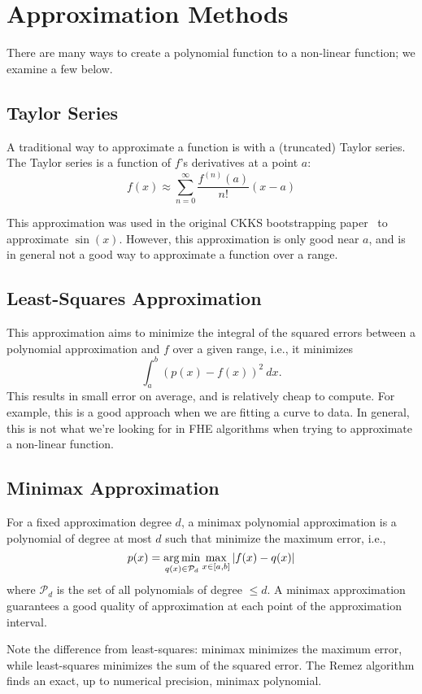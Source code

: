 \documentclass[../fheimpl.tex]{subfiles}
\begin{document}
    \section{Approximation Methods}
    \label{sec:polyapprox}
    There are many ways to create a polynomial function to a non-linear function; we examine a few below.
    
    
    \subsection{Taylor Series}
    A traditional way to approximate a function is with a (truncated) Taylor series. The Taylor series is a function of $f$'s derivatives at a point $a$: 
    \[f(x)\approx \sum_{n=0}^\infty\frac{f^{(n)}(a)}{n!}(x-a)\]
    
    This approximation was used in the original CKKS bootstrapping paper~\cite{cryptoeprint:2018/153} to approximate $\sin(x)$.
    However, this approximation is only good near $a$, and is in general not a good way to approximate a function over a range.
    
    
    \subsection{Least-Squares Approximation}
    This approximation aims to minimize the integral of the squared errors between a polynomial approximation and $f$ over a given range, i.e., it minimizes
    \[\int_a^b (p(x)-f(x))^2\ dx.\] 
    This results in small error on average, and is relatively cheap to compute. For example, this is a good approach when we are fitting a curve to data. In general, this is not what we're looking for in FHE algorithms when trying to approximate a non-linear function.
    
    
    \subsection{Minimax Approximation}
    For a fixed approximation degree $d$, a minimax polynomial approximation is a polynomial of degree at most $d$ such that minimize the maximum error, i.e., 
    \[p(x) = \operatorname*{arg\,min}_{q(x)\in\mathcal{P}_d}\max_{x\in[a,b]} |f(x)-q(x)|\]
    where $\mathcal{P}_d$ is the set of all polynomials of degree $\le d$.
    A minimax approximation guarantees a good quality of approximation at each point of the approximation interval.\cite[\S2.3]{cryptoeprint:2022/280}
    
    Note the difference from least-squares: minimax minimizes the maximum error, while least-squares minimizes the sum of the squared error. The Remez algorithm finds an exact, up to numerical precision, minimax polynomial.
    
\end{document}
